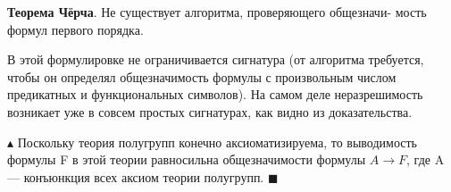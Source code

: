 \textbf{Теорема Чёрча}. Не существует алгоритма, проверяющего общезначи-
мость формул первого порядка.

В этой формулировке не ограничивается сигнатура (от алгоритма требуется, чтобы он определял общезначимость формулы с произвольным числом предикатных и функциональных символов). На
самом деле неразрешимость возникает уже в совсем простых сигнатурах, как видно из доказательства.

$\blacktriangle$
Поскольку теория полугрупп конечно аксиоматизируема, то выводимость формулы F в этой теории равносильна общезначимости формулы $A \rightarrow F$, где A — конъюнкция всех аксиом теории полугрупп.
$\blacksquare$